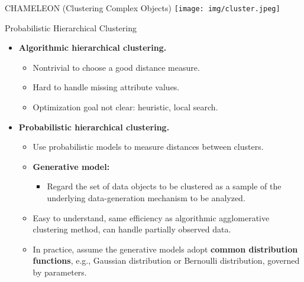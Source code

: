\begin{frame}{CHAMELEON (Clustering Complex Objects)}
	\centering
	\texttt{[image: img/cluster.jpeg]}
\end{frame}

\begin{frame}{Probabilistic Hierarchical Clustering}
	\centering
	\begin{itemize}
		\item \textbf{Algorithmic hierarchical clustering.}
		      \begin{itemize}
			      \item Nontrivial to choose a good distance measure.
			      \item Hard to handle missing attribute values.
			      \item Optimization goal not clear: heuristic, local search.
		      \end{itemize}
		\item \textbf{Probabilistic hierarchical clustering.}
		      \begin{itemize}
			      \item Use probabilistic models to measure distances between
			            clusters.
			      \item \textbf{\color{airforceblue}Generative model:}
			            \begin{itemize}
				            \item Regard the set of data objects to be clustered as a
				                  sample of the underlying data-generation mechanism to be
				                  analyzed.
			            \end{itemize}
			      \item Easy to understand, same efficiency as algorithmic
			            agglomerative clustering method, can handle partially observed data.
			      \item In practice, assume the generative models adopt
			            \textbf{\color{airforceblue}common distribution functions}, e.g.,
			            Gaussian distribution or Bernoulli distribution, governed by
			            parameters.
		      \end{itemize}
	\end{itemize}
\end{frame}

